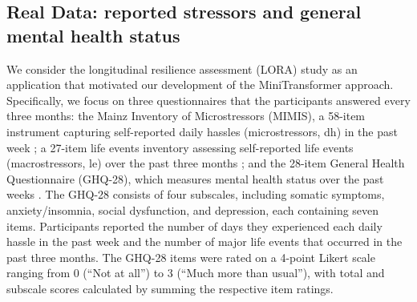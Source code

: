 \documentclass[AMA,Times1COL]{WileyNJDv5} %
\begin{document}

\subsection{Real Data: reported stressors and general mental health status}
 We consider the longitudinal resilience assessment (LORA) study \citep{chmitorz_longitudinal_2021} as an application that motivated our development of the MiniTransformer approach. Specifically, we focus on three questionnaires that the participants answered every three months: the Mainz Inventory of Microstressors (MIMIS), a 58-item instrument capturing self-reported daily hassles (microstressors, dh) in the past week \citep{chmitorz_assessment_2020}; a 27-item life events inventory assessing self-reported life events (macrostressors, le) over the past three months \citep{canli_neural_2006}; and the 28-item General Health Questionnaire (GHQ-28), which measures mental health status over the past weeks \citep{goldberg_validity_1997}. The GHQ-28 consists of four subscales, including somatic symptoms, anxiety/insomnia, social dysfunction, and depression, each containing seven items. Participants reported the number of days they experienced each daily hassle in the past week and the number of major life events that occurred in the past three months. The GHQ-28 items were rated on a 4-point Likert scale ranging from 0 (“Not at all”) to 3 (“Much more than usual”), with total and subscale scores calculated by summing the respective item ratings. 
 
\end{document}
